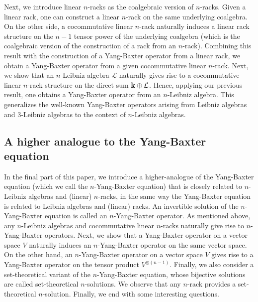 \documentclass[a4paper,reqno,10pt]{amsart}
\theoremstyle{plain}
\theoremstyle{definition}
\theoremstyle{remark}
\begin{document}
Next, we introduce linear $n$-racks as the coalgebraic version of $n$-racks. Given a linear rack, one can construct a linear $ n$-rack on the same underlying coalgebra. On the other side, a cocommutative linear $n$-rack naturally induces a linear rack structure on the $n-1$ tensor power of the underlying coalgebra (which is the coalgebraic version of the construction of a rack from an $n$-rack). Combining this result with the construction of a Yang-Baxter operator from a linear rack, we obtain a Yang-Baxter operator from a given cocommutative linear $n$-rack. Next, we show that an $n$-Leibniz algebra $\mathcal{L}$ naturally gives rise to a cocommutative linear $n$-rack structure on the direct sum ${\bf k} \oplus \mathcal{L}$. Hence, applying our previous result, one obtains a Yang-Baxter operator from an $n$-Leibniz algebra. This generalizes the well-known Yang-Baxter operators arising from Leibniz algebras \cite{lebed} and $3$-Leibniz algebras \cite{xu-sheng} to the context of $n$-Leibniz algebras.




\subsection{A higher analogue to the Yang-Baxter equation} 
In the final part of this paper, we introduce a higher-analogue of the Yang-Baxter equation (which we call the $n$-Yang-Baxter equation) that is closely related to $n$-Leibniz algebras and (linear) $n$-racks, in the same way the Yang-Baxter equation is related to Leibniz algebras and (linear) racks. An invertible solution of the $n$-Yang-Baxter equation is called an $n$-Yang-Baxter operator. As mentioned above, any $n$-Leibniz algebras and cocommutative linear $n$-racks naturally give rise to $n$-Yang-Baxter operators. Next, we show that a Yang-Baxter operator on a vector space $V$ naturally induces an $n$-Yang-Baxter operator on the same vector space. On the other hand, an $n$-Yang-Baxter operator on a vector space $V$ gives rise to a Yang-Baxter operator on the tensor product $V^{\otimes (n-1)}$. Finally, we also consider a set-theoretical variant of the $n$-Yang-Baxter equation, whose bijective solutions are called set-theoretical $n$-solutions. We observe that any $n$-rack provides a set-theoretical $n$-solution. Finally, we end with some interesting questions.
\end{document}
